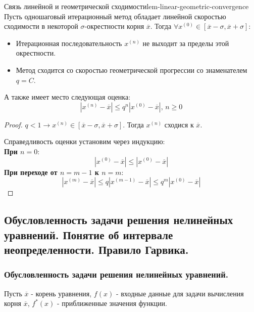 \documentclass[14pt]{extarticle}
\begin{document}
    \begin{lemma}{Связь линейной и геометрической сходимости}{lem-linear-geometric-convergence}
        Пусть одношаговый итерационный метод обладает линейной скоростью сходимости в некоторой $\sigma$-окрестности корня $\overline{x}$. Тогда $\forall x^{(0)} \in [\overline{x} - \sigma, \overline{x} + \sigma]$: 
        \begin{itemize}
            \item Итерационная последовательность $x^{(n)}$ не выходит за пределы  этой окрестности.
            \item Метод сходится со скоростью геометрической прогрессии со знаменателем $q = C$.
        \end{itemize}
        А также имеет место следующая оценка:
        $$|x^{(n)} - \overline{x}| \leq q^{n}|x^{(0)} - \overline{x}| \text{, } n \geq 0$$
    
        \begin{proof}
            $q < 1 \rightarrow x^{(n)} \in [\overline{x} - \sigma, \overline{x} + \sigma]$. Тогда $x^{(n)}$ сходися к $\overline{x}$.

            Справедливость оценки установим через индукцию:\\
            \textbf{При $n = 0$}: 
            $$|x^{(0)} - \overline{x}| \leq |x^{(0)} - \overline{x}|$$
            \textbf{При переходе от $n = m - 1$ к $n = m$}:
            $$|x^{(m)} - \overline{x}| \leq q|x^{(m-1)} - \overline{x}| \leq q^{m}|x^{(0)} - \overline{x}|$$
        \end{proof}
    \end{lemma}


\subsection{Обусловленность задачи решения нелинейных уравнений. Понятие об интервале неопределенности. Правило Гарвика.}

    \subsubsection{Обусловленность задачи решения нелинейных уравнений.}

        Пусть $\overline{x}$ - корень уравнения, $f(x)$ - входные данные для задачи вычисления корня $\overline{x}$, $f^{*}(x)$ - приближенные значения функции.
    
\end{document}
